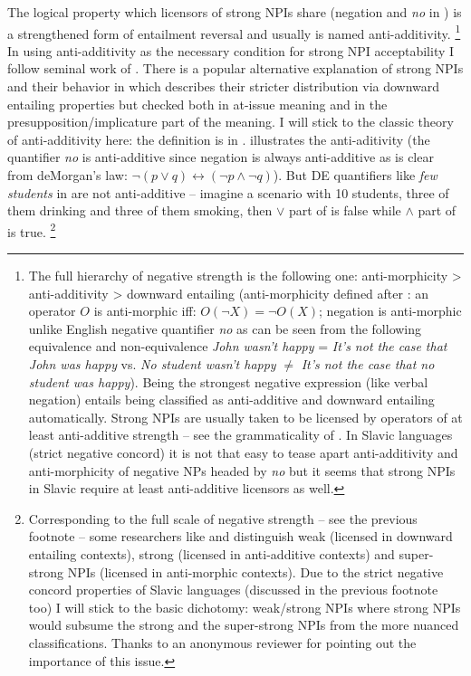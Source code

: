 \documentclass[output=paper,
]{langscibook}
\begin{document}
\ea\label{ex-18} 
\label{ex-18-b}
\z
\z

\noindent The logical property which licensors of strong NPIs share (negation and \textit{no} in ) is a strengthened form of entailment reversal and usually is named anti-additivity.%
\footnote{The full hierarchy of negative strength is the following one: anti-morphicity > anti-additivity > downward entailing (anti-morphicity defined after \citealt{krifka1995semantics}: an operator $O$ is anti-morphic iff: $O(\neg X)=\neg O(X)$; negation is anti-morphic unlike English negative quantifier \textit{no} as can be seen from the following equivalence and non-equivalence \textit{John wasn't happy} = \textit{It's not the case that John was happy} vs. \textit{No student wasn't happy} $\neq$ \textit{It's not the case that no student was happy}). Being the strongest negative expression (like verbal negation) entails being classified as anti-additive and downward entailing automatically. Strong NPIs are usually taken to be licensed by operators of at least anti-additive strength -- see the grammaticality of . In Slavic languages (strict negative concord) it is not that easy to tease apart anti-additivity and anti-morphicity of negative NPs headed by \textit{no} but it seems that strong NPIs in Slavic require at least anti-additive licensors as well.}
In using anti-additivity as the necessary condition for strong NPI acceptability I follow seminal work of \cite{zwarts1998three}. There is a popular alternative explanation of strong NPIs and their behavior in \cite{gajewski2011licensing} which describes their stricter distribution via downward entailing properties but checked both in at-issue meaning and in the presupposition/implicature part of the meaning. I will stick to the classic theory of anti-additivity here: the definition is in .  illustrates the anti-aditivity (the quantifier \textit{no} is anti-additive since negation is always anti-additive as is clear from deMorgan's law: $\neg(p \vee q) \leftrightarrow (\neg p \wedge \neg q)$). But DE quantifiers like \textit{few students} in  are not anti-additive -- imagine a scenario with 10 students, three of them drinking and three of them smoking, then $\vee$ part of  is false while $\wedge$ part of  is true.%
\footnote{Corresponding to the full scale of negative strength -- see the previous footnote -- some researchers like \citet{krifka1995semantics} and \citet{van2002negative} distinguish weak (licensed in downward entailing contexts), strong (licensed in anti-additive contexts) and super-strong NPIs (licensed in anti-morphic contexts). Due to the strict negative concord properties of Slavic languages (discussed in the previous footnote too) I will stick to the basic dichotomy: weak/strong NPIs where strong NPIs would subsume the strong and the super-strong NPIs from the more nuanced classifications. Thanks to an anonymous reviewer for pointing out the importance of this issue.}
\end{document}
